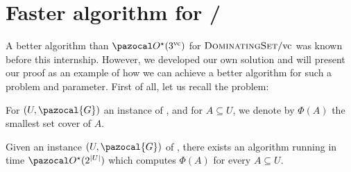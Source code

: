 \section{Faster algorithm for /\vc}
\label{section:domset-vc}

A better algorithm than $\O^\star(3^\vc)$ for $\textsc{DominatingSet}/\text{vc}$ was known before this internship. However, we developed our own solution and will present our proof as an example of how we can achieve a better algorithm for such a problem and parameter. First of all, let us recall the  problem:

\begin{problem}
\end{problem}

For $(U, \pazocal{G})$ an instance of , and for $A \subseteq U$, we denote by $\Phi(A)$ the smallest set cover of $A$.

\begin{lemma}
    \label{lemma:set-cover}
    Given an instance $(U, \pazocal{G})$ of , there exists an algorithm running in time $\O^\star(2^{|U|})$ which computes $\Phi(A)$ for every $A \subseteq U$.
\end{lemma}

